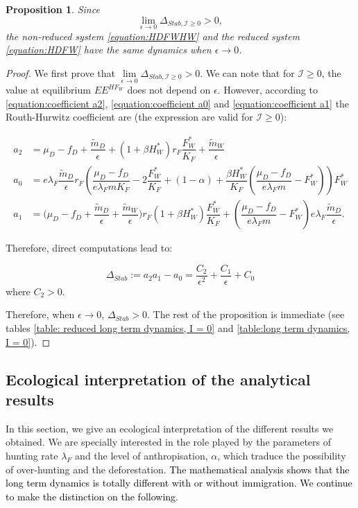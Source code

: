 \documentclass{article}
\newcommand{\lfw}{\lambda_{F}}
\newcommand{\lfw}{\lambda_{F}}
\newcommand{\cI}{\mathcal{I}}
\newcommand{\vdeux}[1]{\textcolor{black}{#1}}
\newcommand{\vtrois}[1]{\textcolor{black}{#1}}
\newtheorem{prop}[theorem]{Proposition}
\theoremstyle{definition}
\theoremstyle{remark}
\begin{document}
\begin{prop}
Since 
$$
\lim\limits_{ \epsilon \rightarrow 0}{\Delta_{Stab, \cI \geq 0}} > 0,
$$
the non-reduced system \eqref{equation:HDFWHW} and the reduced system \eqref{equation:HDFW} have the same dynamics when $\epsilon \rightarrow 0$.
\end{prop}
\begin{proof}
We first prove that $\lim\limits_{ \epsilon \rightarrow 0}{\Delta_{Stab, \cI \geq 0}} > 0$. We can note that for $\cI \geq 0$, the value at equilibrium $EE^{HF_W}$ does not depend on $\epsilon$. However, according to \eqref{equation:coefficient a2}, \eqref{equation:coefficient a0} and \eqref{equation:coefficient a1} the Routh-Hurwitz coefficient are (the expression are valid for $\cI \geq 0$):

\begin{align*}
a_2  &= \mu_D - f_D + \dfrac{\tilde m_D}{\epsilon} + (1+\beta H_W^*)r_F \dfrac{F_W^*}{K_F} + \dfrac{\tilde m_W}{\epsilon} \\
a_0 &= e \lfw \dfrac{\tilde m_D}{\epsilon} r_F \left(\dfrac{\mu_D -f_D }{e \lfw m K_F} - 2\dfrac{F_W^*}{K_F} + (1-\alpha) + \dfrac{\beta H_W^*}{K_F} \left(\dfrac{\mu_D -f_D }{e \lfw m} - F_W^*\right) \right) F_W^* \\
a_1 &= \Big( \mu_D  -f_D + \dfrac{\tilde m_D}{\epsilon} + \dfrac{\tilde m_W}{\epsilon} \Big) r_F(1+ \beta H_W^*) \dfrac{F^*_W}{K_F} + \left(\dfrac{\mu_D -f_D}{e\lfw m} - F_W^*\right) e \lfw \dfrac{\tilde m_D}{\epsilon}.
\end{align*}

Therefore, direct computations lead to:

\begin{equation*}
\Delta_{Stab} := a_2 a_1 - a_0 = \dfrac{C_2}{\epsilon^2} + \dfrac{C_1}{\epsilon} + C_0
\end{equation*}
where $C_2 > 0$.

Therefore, when $\epsilon \rightarrow 0$, $\Delta_{Stab} > 0$. The rest of the proposition is immediate (see tables \ref{table: reduced long term dynamics, I = 0} and \ref{table:long term dynamics, I = 0}).
\end{proof}


\subsection{Ecological interpretation of the analytical results} \label{sec:ecological}
In this section, we give an ecological interpretation of the different results we obtained. We are specially interested in the role played by the parameters of hunting rate $\lfw$ and the level of anthropisation, $\alpha$, which traduce the possibility of over-hunting and the deforestation. 
\vdeux{
The mathematical analysis shows that \vtrois{the long term dynamics} is totally different with or without immigration. We continue to make the distinction on the following.}
\end{document}
